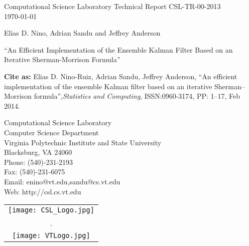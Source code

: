 \documentclass[12pt]{article}
\begin{document}
\thispagestyle{empty}
\setcounter{page}{0}

\begin{Huge}
\begin{center}
Computational Science Laboratory Technical Report CSL-TR-00-2013\\
\today
\end{center}
\end{Huge}
\vfil
\begin{huge}
\begin{center}
Elias D. Nino, Adrian Sandu and Jeffrey Anderson
\end{center}
\end{huge}

\vfil
\begin{huge}
\begin{it}
\begin{center}
``An Efficient Implementation of the Ensemble Kalman Filter Based on an Iterative Sherman-Morrison Formula''
\end{center}
\end{it}
\end{huge}
\vfil
{\tiny
\textbf{Cite as:} Elias D. Nino-Ruiz, Adrian Sandu, Jeffrey Anderson, ``An efficient implementation of the ensemble Kalman filter based on an iterative Sherman–Morrison formula'',\textit{Statistics and Computing}, ISSN:0960-3174, PP: 1--17, Feb 2014.}

\begin{large}
\begin{center}
Computational Science Laboratory \\
Computer Science Department \\
Virginia Polytechnic Institute and State University \\
Blacksburg, VA 24060 \\
Phone: (540)-231-2193 \\
Fax: (540)-231-6075 \\ 
Email: {\rm enino@vt.edu},{\rm sandu@cs.vt.edu} \\
Web: {\rm http://csl.cs.vt.edu}
\end{center}
\end{large}

\vspace*{1cm}

\begin{center}
\begin{tabular}{c}
\texttt{[image: CSL\_Logo.jpg]}\\ 
.  \\
\texttt{[image: VTLogo.jpg]} \\
\end{tabular}
\end{center}
\end{document}
